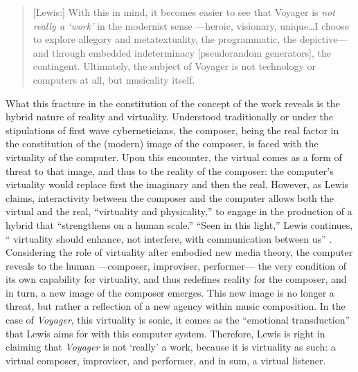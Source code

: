 \begin{quote}
	[Lewis:] With this in mind, it becomes easier to see that Voyager is \textit{not really a `work'} in the modernist sense ---heroic, visionary, unique\dots I choose to explore allegory and metatextuality, the programmatic, the depictive--- and through embedded indeterminacy [pseudorandom generators], the contingent. Ultimately, the subject of Voyager is not technology or computers at all, but musicality itself. \im \parencite[110]{Lew99:Int}
\end{quote}

What this fracture in the constitution of the concept of the work reveals is the hybrid nature of reality and virtuality. Understood traditionally or under the stipulations of first wave cyberneticians, the composer, being the real factor in the constitution of the (modern) image of the composer, is faced with the virtuality of the computer. Upon this encounter, the virtual comes as a form of threat to that image, and thus to the reality of the composer: the computer's virtuality would replace first the imaginary and then the real. However, as Lewis claims, interactivity between the composer and the computer allows both the virtual and the real, ``virtuality and physicality,'' to engage in the production of a hybrid that ``strengthens on a human scale.'' ``Seen in this light,'' Lewis continues, `` virtuality should enhance, not interfere, with communication between us'' \parencite[110]{Lew99:Int}. Considering the role of virtuality after embodied new media theory, the computer reveals to the human ---composer, improviser, performer--- the very condition of its own capability for virtuality, and thus redefines reality for the composer, and in turn, a new image of the composer emerges. This new image is no longer a threat, but rather a reflection of a new agency within music composition. In the case of \textit{Voyager}, this virtuality is sonic, it comes as the ``emotional transduction'' that Lewis aims for with this computer system. Therefore, Lewis is right in claiming that \textit{Voyager} is not `really' a work, because it is virtuality as such: a virtual composer, improviser, and performer, and in sum, a virtual listener.

